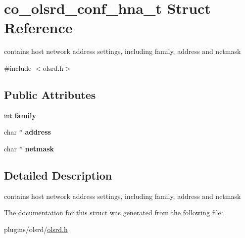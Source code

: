 \hypertarget{structco__olsrd__conf__hna__t}{\section{co\+\_\+olsrd\+\_\+conf\+\_\+hna\+\_\+t Struct Reference}
\label{structco__olsrd__conf__hna__t}
}


contains host network address settings, including family, address and netmask  




{\ttfamily \#include $<$olsrd.\+h$>$}

\subsection*{Public Attributes}
\begin{DoxyCompactItemize}
\item 
\hypertarget{structco__olsrd__conf__hna__t_a2e9a130f7a50b568bbb689f9bc41668a}{int {\bfseries family}}\label{structco__olsrd__conf__hna__t_a2e9a130f7a50b568bbb689f9bc41668a}

\item 
\hypertarget{structco__olsrd__conf__hna__t_a80332f47fb5a7d11067c8db985ceccbd}{char $\ast$ {\bfseries address}}\label{structco__olsrd__conf__hna__t_a80332f47fb5a7d11067c8db985ceccbd}

\item 
\hypertarget{structco__olsrd__conf__hna__t_a82b7e95401801c8d539e54183abbde3d}{char $\ast$ {\bfseries netmask}}\label{structco__olsrd__conf__hna__t_a82b7e95401801c8d539e54183abbde3d}

\end{DoxyCompactItemize}


\subsection{Detailed Description}
contains host network address settings, including family, address and netmask 

The documentation for this struct was generated from the following file\+:\begin{DoxyCompactItemize}
\item 
plugins/olsrd/\hyperlink{olsrd_8h}{olsrd.\+h}\end{DoxyCompactItemize}
